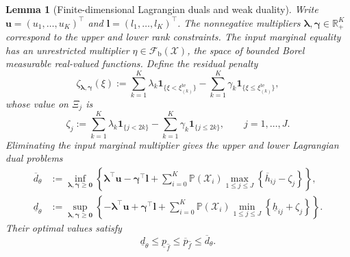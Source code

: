 \documentclass[review,11pt,3p,authoryear,nopreprintline]{elsarticle}
\newtheorem{lemma}{Lemma}
\begin{document}
\begin{lemma}[Finite-dimensional Lagrangian duals and weak duality]
  \label{lem-weak-duality}
  Write $\bm u=(u_1,\ldots,u_K)^\top$ and $\bm l=(l_1,\ldots,l_K)^\top$. The nonnegative multipliers $\bm\lambda,\bm\gamma\in\mathbb R_+^K$ correspond to the upper and lower rank constraints. The input marginal equality has an unrestricted multiplier $\eta\in\mathcal F_{\mathrm b}(\mathcal X)$, the space of bounded Borel measurable real-valued functions. Define the residual penalty
  \begin{equation}
    \zeta_{\bm\lambda,\bm\gamma}(\xi)
    :=\sum_{k=1}^{K}\lambda_k\mathbf1_{\{\xi<\xi_{(k)}^{\mathrm{te}}\}}
      -\sum_{k=1}^{K}\gamma_k\mathbf1_{\{\xi\le\xi_{(k)}^{\mathrm{te}}\}},
    \label{eq-dual-step-function}
  \end{equation}
  whose value on $\Xi_j$ is
  \begin{equation}
    \zeta_j:=\sum_{k=1}^{K}\lambda_k\mathbf1_{\{j<2k\}}
      -\sum_{k=1}^{K}\gamma_k\mathbf1_{\{j\le2k\}},
    \qquad j=1,\ldots,J.
    \label{eq-dual-cell-values}
  \end{equation}
  Eliminating the input marginal multiplier gives the upper and lower Lagrangian dual problems
  \begin{align}
    \overline d_\theta
      &:=\inf_{\bm\lambda,\bm\gamma\ge\bm0}\left\{
        \bm\lambda^\top\bm u-\bm\gamma^\top\bm l
        +\sum_{i=0}^{K}\mathbb P(\mathcal X_i)\max_{1\le j\le J}
          \left\{\overline h_{ij}-\zeta_j\right\}\right\},
      \label{eq-upper-measure-dual}\\
    \underline d_\theta
      &:=\sup_{\bm\lambda,\bm\gamma\ge\bm0}\left\{
        -\bm\lambda^\top\bm u+\bm\gamma^\top\bm l
        +\sum_{i=0}^{K}\mathbb P(\mathcal X_i)\min_{1\le j\le J}
          \left\{\underline h_{ij}+\zeta_j\right\}\right\}.
      \label{eq-lower-measure-dual}
  \end{align}
  Their optimal values satisfy
  \begin{equation}
    \underline d_\theta\le\underline p_{\hat f}
      \le\overline p_{\hat f}\le\overline d_\theta.
    \label{eq-weak-duality}
  \end{equation}
\end{lemma}
\end{document}
